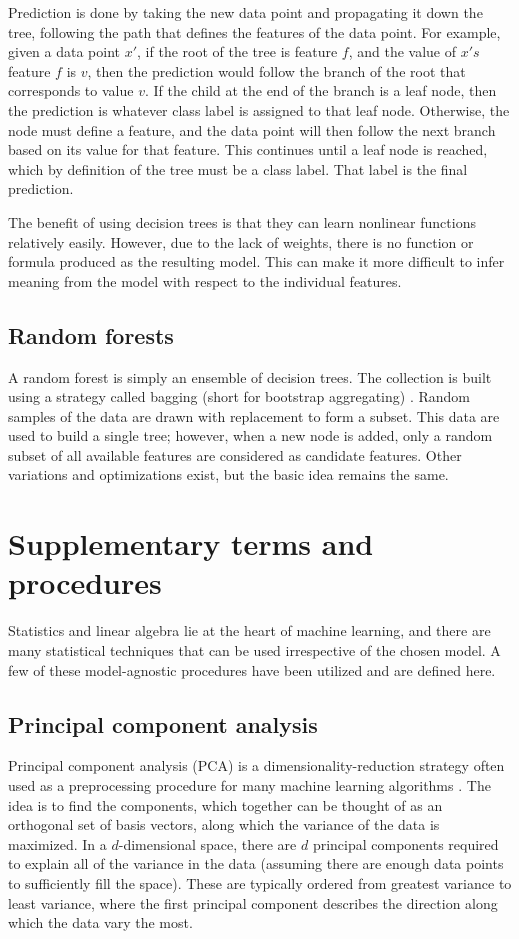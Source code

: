 Prediction is done by taking the new data point and propagating it down the tree, following the path that defines the features of the data point.  For example, given a data point $x'$, if the root of the tree is feature $f$, and the value of $x's$ feature $f$ is $v$, then the prediction would follow the branch of the root that corresponds to value $v$.  If the child at the end of the branch is a leaf node, then the prediction is whatever class label is assigned to that leaf node.  Otherwise, the node must define a feature, and the data point will then follow the next branch based on its value for that feature.  This continues until a leaf node is reached, which by definition of the tree must be a class label.  That label is the final prediction.

The benefit of using decision trees is that they can learn nonlinear functions relatively easily.  However, due to the lack of weights, there is no function or formula produced as the resulting model.  This can make it more difficult to infer meaning from the model with respect to the individual features.

\subsection{Random forests}
A random forest is simply an ensemble of decision trees.  The collection is built using a strategy called bagging (short for bootstrap aggregating) \cite{breiman2001}.  Random samples of the data are drawn with replacement to form a subset.  This data are used to build a single tree; however, when a new node is added, only a random subset of all available features are considered as candidate features.  Other variations and optimizations exist, but the basic idea remains the same.

\section{Supplementary terms and procedures}
Statistics and linear algebra lie at the heart of machine learning, and there are many statistical techniques that can be used irrespective of the chosen model.  A few of these model-agnostic procedures have been utilized and are defined here.

\subsection{Principal component analysis}
Principal component analysis (PCA) is a dimensionality-reduction strategy often used as a preprocessing procedure for many machine learning algorithms \cite{tharwat2016}.  The idea is to find the components, which together can be thought of as an orthogonal set of basis vectors, along which the variance of the data is maximized.  In a $d$-dimensional space, there are $d$ principal components required to explain all of the variance in the data (assuming there are enough data points to sufficiently fill the space).  These are typically ordered from greatest variance to least variance, where the first principal component describes the direction along which the data vary the most.

